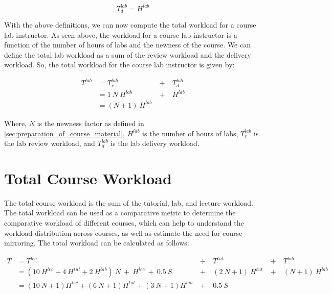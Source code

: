 \begin{equation}
  \label{eqn:lab-delivery-workload}
  T_d^{lab} = H^{lab}
\end{equation}

With the above definitions, we can now compute the total workload for a course lab instructor. As seen above, the workload for a course lab instructor is a function of the number of hours of labs and the newness of the course. We can define the total lab workload as a sum of the review workload and the delivery workload. So, the total workload for the course lab instructor is given by:

\begin{equation}
  \begin{aligned}
    T^{lab} & = T_r^{lab}        & \ +\  & T_d^{lab} \\
            & = 1\ N\ H^{lab}    & \ +\  & H^{lab}   \\
            & = (N + 1)\ H^{lab}
  \end{aligned}
  \label{eqn:lab-workload}
\end{equation}

Where, \(N\) is the newness factor as defined in \autoref{sec:preparation_of_course_material}, \(H^{lab}\) is the number of hours of labs, \(T_r^{lab}\) is the lab review workload, and \(T_d^{lab}\) is the lab delivery workload.

\section{Total Course Workload}

The total course workload is the sum of the tutorial, lab, and lecture workload. The total workload can be used as a comparative metric to determine the comparative workload of different courses, which can help to understand the workload distribution across courses, as well as estimate the need for course mirroring. The total workload can be calculated as follows:

\begin{equation}
  \label{eqn:total-course-workload}
  \begin{aligned}
    T & = T^{lec}                                                               & \ +\  & T^{tut}             & \ +\  & T^{lab}          \\
      & = (10\ H^{lec} + 4\ H^{tut} + 2\ H^{lab})\ N\ +\ H^{lec}  \ +\   0.5\ S & \ +\  & (2\ N + 1)\ H^{tut} & \ +\  & (N + 1)\ H^{lab} \\
      & = (10\ N + 1)H^{lec} + (6\ N + 1)H^{tut} + (3\ N + 1)H^{lab}            & \ +\  & 0.5\ S
  \end{aligned}
\end{equation}

